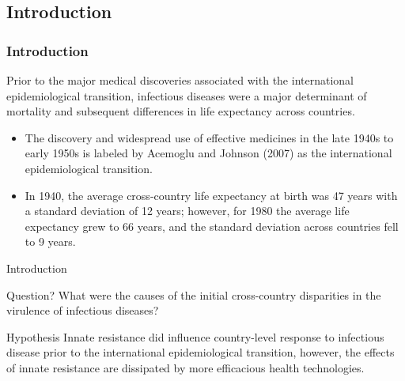 \documentclass[pdftex,12pt,xcolor=pdftex,table]{beamer}
\theoremstyle{definition}
\theoremstyle{remark}
\numberwithin{equation}{section}
\numberwithin{figure}{section}
\begin{document}
\begin{frame}\section{Introduction}
\frametitle{Introduction}
  
\justifying
Prior to the major medical discoveries associated with the international epidemiological transition, infectious diseases were a major determinant of mortality and subsequent differences in life expectancy across countries. 
\justifying
\begin{itemize}

    \item The discovery and widespread use of effective medicines in the late 1940s to early 1950s is labeled by Acemoglu and Johnson (2007) as the international epidemiological transition.
   \item In 1940, the average cross-country life expectancy at birth was 47 years with a standard deviation of 12 years; however, for 1980 the average life expectancy grew to 66 years, and the standard deviation across countries fell to 9 years. 

\end{itemize}

\end{frame}

\begin{frame}{Introduction}
\justifying
\begin{block}{Question?}
What were the causes of the initial cross-country disparities in the virulence of infectious diseases?
\end{block}

\begin{block}{Hypothesis}
Innate resistance did influence country-level response to infectious disease prior to the international epidemiological transition, however, the effects of innate resistance are dissipated by more efficacious health technologies.

\end{block}
\end{frame}
\end{document}
